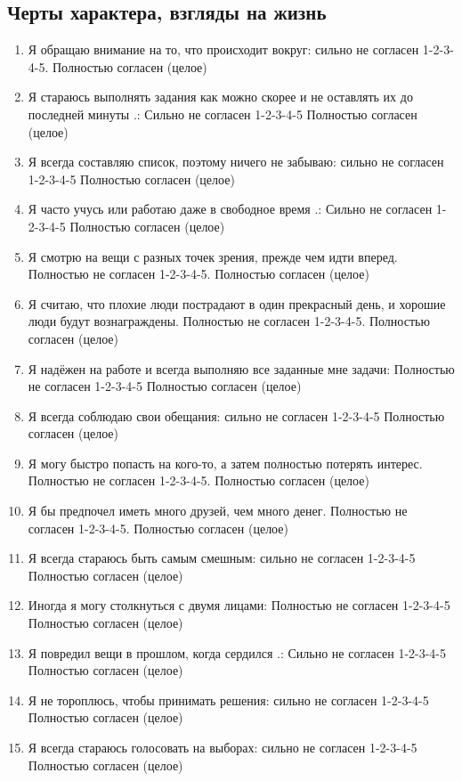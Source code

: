 \documentclass[11pt]{article}
\begin{document}
\subsection{Черты характера, взгляды на жизнь}
\begin{enumerate}
\item Я обращаю внимание на то, что происходит вокруг: сильно не согласен 1-2-3-4-5. Полностью согласен (целое)
\item Я стараюсь выполнять задания как можно скорее и не оставлять их до последней минуты .: Сильно не согласен 1-2-3-4-5 Полностью согласен (целое)
\item Я всегда составляю список, поэтому ничего не забываю: сильно не согласен 1-2-3-4-5 Полностью согласен (целое)
\item Я часто учусь или работаю даже в свободное время .: Сильно не согласен 1-2-3-4-5 Полностью согласен (целое)
\item Я смотрю на вещи с разных точек зрения, прежде чем идти вперед. Полностью не согласен 1-2-3-4-5. Полностью согласен (целое)
\item Я считаю, что плохие люди пострадают в один прекрасный день, и хорошие люди будут вознаграждены. Полностью не согласен 1-2-3-4-5. Полностью согласен (целое)
\item Я надёжен на работе и всегда выполняю все заданные мне задачи: Полностью не согласен 1-2-3-4-5 Полностью согласен (целое)
\item Я всегда соблюдаю свои обещания: сильно не согласен 1-2-3-4-5 Полностью согласен (целое)
\item Я могу быстро попасть на кого-то, а затем полностью потерять интерес. Полностью не согласен 1-2-3-4-5. Полностью согласен (целое)
\item Я бы предпочел иметь много друзей, чем много денег. Полностью не согласен 1-2-3-4-5. Полностью согласен (целое)
\item Я всегда стараюсь быть самым смешным: сильно не согласен 1-2-3-4-5 Полностью согласен (целое)
\item Иногда я могу столкнуться с двумя лицами: Полностью не согласен 1-2-3-4-5 Полностью согласен (целое)
\item Я повредил вещи в прошлом, когда сердился .: Сильно не согласен 1-2-3-4-5 Полностью согласен (целое)
\item Я не тороплюсь, чтобы принимать решения: сильно не согласен 1-2-3-4-5 Полностью согласен (целое)
\item Я всегда стараюсь голосовать на выборах: сильно не согласен 1-2-3-4-5 Полностью согласен (целое)

\end{enumerate}
\end{document}
